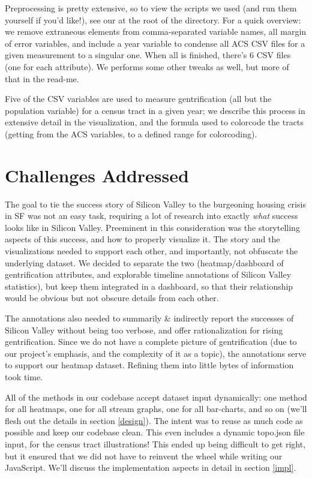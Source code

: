 \documentclass{article}
\begin{document}
    Preprocessing is pretty extensive, so to view the scripts we used (and run them yourself if you'd like!), see our  at the root of the directory. For a quick overview: we remove extraneous elements from comma-separated variable names, all margin of error variables, and include a year variable to condense all ACS CSV files for a given measurement to a singular one. When all is finished, there's 6 CSV files (one for each attribute). We performs some other tweaks as well, but more of that in the read-me.

    Five of the CSV variables are used to measure gentrification (all but the population variable) for a census tract in a given year; we describe this process in extensive detail in the visualization, and the formula used to colorcode the tracts (getting from the ACS variables, to a defined range for colorcoding).

\section{Challenges Addressed}

    The goal to tie the success story of Silicon Valley to the burgeoning housing crisis in SF was not an easy task, requiring a lot of research into exactly \textit{what} success looks like in Silicon Valley. Preeminent in this consideration was the storytelling aspects of this success, and how to properly visualize it. The story and the visualizations needed to support each other, and importantly, not obfuscate the underlying dataset. We decided to separate the two (heatmap/dashboard of gentrification attributes, and explorable timeline annotations of Silicon Valley statistics), but keep them integrated in a dashboard, so that their relationship would be obvious but not obscure details from each other.
    
    The annotations also needed to summarily \& indirectly report the successes of Silicon Valley without being too verbose, and offer rationalization for rising gentrification. Since we do not have a complete picture of gentrification (due to our project's emphasis, and the complexity of it as a topic), the annotations serve to support our heatmap dataset. Refining them into little bytes of information took time.
    
    All of the methods in our codebase accept dataset input dynamically: one method for all heatmaps, one for all stream graphs, one for all bar-charts, and so on (we'll flesh out the details in section \ref{design}). The intent was to reuse as much code as possible and keep our codebase clean. This even includes a dynamic topo.json file input, for the census tract illustrations! This ended up being difficult to get right, but it ensured that we did not have to reinvent the wheel while writing our JavaScript. We'll discuss the implementation aspects in detail in section \ref{impl}.
     
\end{document}
